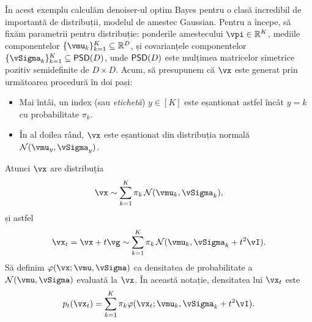 \documentclass[../../book-main_ro.tex]{subfiles}
\begin{document}
\begin{example}\label{example:denoising_gaussian_mixture}
	În acest exemplu calculăm denoiser-ul optim Bayes pentru o clasă incredibil de importantă de distribuții, modelul de amestec Gaussian. Pentru a începe, să fixăm parametrii pentru distribuție: ponderile amestecului \(\vpi \in \R^{K}\), mediile componentelor \(\{\vmu_{k}\}_{k = 1}^{K} \subseteq \R^{D}\), și covarianțele componentelor \(\{\vSigma_{k}\}_{k = 1}^{K} \subseteq \PSD(D)\), unde \(\mathsf{PSD}(D)\) este mulțimea matricelor simetrice pozitiv semidefinite de \(D \times D\). Acum, să presupunem că \(\vx\) este generat prin următoarea procedură în doi pași:
	\begin{itemize}
		\item Mai întâi, un index (sau \textit{etichetă}) \(y \in [K]\) este eșantionat astfel încât \(y = k\) cu probabilitate \(\pi_{k}\).
		\item În al doilea rând, \(\vx\) este eșantionat din distribuția normală \(\dNorm(\vmu_{y}, \vSigma_{y})\).
	\end{itemize}
	Atunci \(\vx\) are distribuția
	\begin{equation}
		\vx \sim \sum_{k = 1}^{K}\pi_{k}\dNorm(\vmu_{k}, \vSigma_{k}),
	\end{equation}
	și astfel
	\begin{equation}
		\vx_{t} = \vx + t\vg \sim \sum_{k = 1}^{K}\pi_{k}\dNorm(\vmu_{k}, \vSigma_{k} + t^{2}\vI).
	\end{equation}
	Să definim \(\phi(\vx ; \vmu, \vSigma)\) ca densitatea de probabilitate a \(\dNorm(\vmu, \vSigma)\) evaluată la \(\vx\). În această notație, densitatea lui \(\vx_{t}\) este
	\begin{equation}
		p_{t}(\vx_{t}) = \sum_{k = 1}^{K}\pi_{k}\phi(\vx_{t} ; \vmu_{k}, \vSigma_{k} + t^{2}\vI).
	\end{equation}


\end{example}
\end{document}
